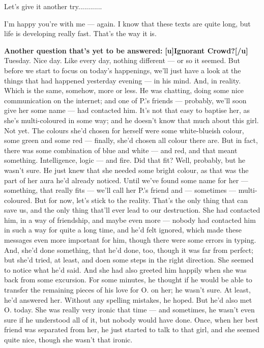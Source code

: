 Let's give it another try............

I'm happy you're with me --- again. I know that these texts are quite long, but life is developing really fast. 
That's the way it is. 

\textbf{Another question that's yet to be answered:}
\textbf{[u]Ignorant Crowd?[/u]}
Tuesday. 
Nice day. 
Like every day, nothing different --- or so it seemed. 
But before we start to focus on today's happenings, we'll just have a look at the things that had happened yesterday evening --- in his mind. 
And, in reality. 
Which is the same, somehow, more or less. 
He was chatting, doing some nice communication on the internet; and one of P.'s friends --- probably, we'll soon give her some name --- had contacted him. 
It's not that easy to baptise her, as she's multi-coloured in some way; and he doesn't know that much about this girl. 
Not yet. 
The colours she'd chosen for herself were some white-blueish colour, some green and some red --- finally, she'd chosen all colour there are. 
But in fact, there was some combination of blue and white --- and red, and that meant something. 
Intelligence, logic --- and fire. 
Did that fit?
Well, probably, but he wasn't sure. 
He just knew that she needed some bright colour, as that was the part of her aura he'd already noticed. 
Until we've found some name for her --- something, that really fits --- we'll call her P.'s friend and --- sometimes --- multi-coloured. 
But for now, let's stick to the reality. 
That's the only thing that can save us, and the only thing that'll ever lead to our destruction. 
She had contacted him, in a way of friendship, and maybe even more --- nobody had contacted him in such a way for quite a long time, and he'd felt ignored, which made these messages even more important for him, though there were some errors in typing. 
And, she'd done something, that he'd done, too, though it was far from perfect; but she'd tried, at least, and doen some steps in the right direction. 
She seemed to notice what he'd said. 
And she had also greeted him happily when she was back from some excursion. 
For some minutes, he thought if he would be able to transfer the remaining pieces of his love for O. on her; he wasn't sure. 
At least, he'd answered her. 
Without any spelling mistakes, he hoped. 
But he'd also met O. today. 
She was really very ironic that time --- and sometimes, he wasn't even sure if he understood all of it, but nobody would have done. 
Once, when her best friend was separated from her, he just started to talk to that girl, and she seemed quite nice, though she wasn't that ironic. 
